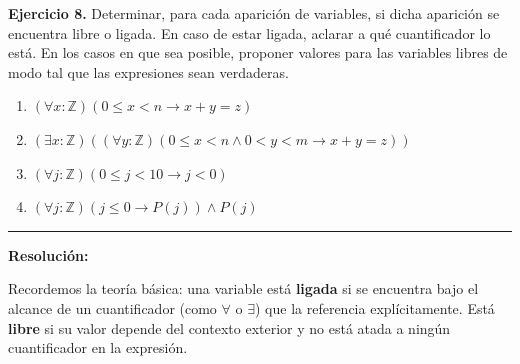 \hypertarget{ej8}{}
\noindent \textbf{Ejercicio 8.} Determinar, para cada aparición de variables, si dicha aparición se encuentra libre o ligada. En caso de estar ligada, aclarar a qué cuantificador lo está. En los casos en que sea posible, proponer valores para las variables libres de modo tal que las expresiones sean verdaderas.

\begin{enumerate}[label=\alph*)]
    \item $(\forall x: \mathbb{Z}) (0 \leq x < n \rightarrow x + y = z)$
    \item $(\exists x: \mathbb{Z}) ((\forall y: \mathbb{Z}) (0 \leq x < n \wedge 0 < y < m \rightarrow x + y = z))$
    \item $(\forall j: \mathbb{Z}) (0 \leq j < 10 \rightarrow j < 0)$
    \item $(\forall j: \mathbb{Z}) (j \leq 0 \rightarrow P(j)) \wedge P(j)$
\end{enumerate}

\vspace{0.2cm}
{\color{gray}\hrule}
\vspace{0.4cm}

\textbf{Resolución:}

Recordemos la teoría básica: una variable está \textbf{ligada} si se encuentra bajo el alcance de un cuantificador (como $\forall$ o $\exists$) que la referencia explícitamente. Está \textbf{libre} si su valor depende del contexto exterior y no está atada a ningún cuantificador en la expresión.

